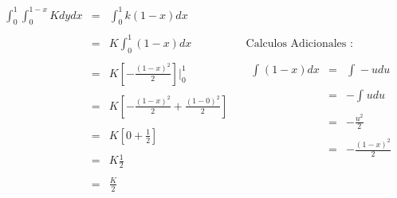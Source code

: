 \documentclass[12pt]{article}
\begin{document}
    \begin{center}
        \begin{equation*}
          \begin{array}{c|c}
                \begin{array}{rcl}
                    \displaystyle\int_{0}^{1}\int_{0}^{1-x} K dy dx & = & \displaystyle\int_{0}^{1} k\left(1-x\right)dx
                    \\
                    \\
                    & = & \displaystyle K\int_{0}^{1}\left(1-x\right)dx
                    \\
                    \\
                    & = &\displaystyle K\left[-\frac{\left(1-x\right)^2}{2}\right]\vert_{0}^{1}
                    \\
                    \\
                    & = &\displaystyle K\left[-\frac{\left(1-x\right)^2}{2} + \frac{\left(1-0\right)^2}{2}\right] 
                    \\
                    \\
                    & = &\displaystyle K\left[0 +\frac{1}{2}\right]
                    \\
                    \\
                    & = & K\frac{1}{2}
                    \\
                    \\
                     & = & \frac{K}{2}
              \end{array}
               &
              \begin{array}{c}
                   \mbox{Calculos Adicionales :}
                   \\
                   \begin{array}{rcl}
                          \\
                          \\
                          \displaystyle\int_{}^{} \left(1-x\right)dx & = & \displaystyle\int_{}^{} -u du
                          \\
                          \\
                          & = & -\int_{}^{}u du
                          \\
                          \\
                          & = & -\frac{u^2}{2}
                          \\
                          \\
                          & = & -\frac{\left(1-x\right)^2}{2} 
                   \end{array}
              \end{array}
            \end{array}
         \end{equation*}
    \end{center}
\end{document}

